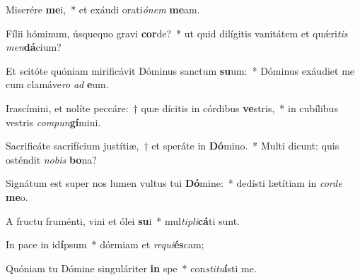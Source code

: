 \item Miserére \textbf{me}i,~* et exáudi orati\tinyhspace\textit{ónem} \textbf{me}am.
\item Fílii hóminum, úsquequo gravi \textbf{cor}de?~* ut quid dilígitis vanitátem et quǽri\tinyhspace\textit{tis} \textit{men}\textbf{dá}cium?
\item Et scitóte quóniam mirificávit Dóminus sanctum \textbf{su}um:~* Dóminus exáudiet me cum clamáve\tinyhspace\textit{ro} \textit{ad} \textbf{e}um.
\item Irascímini, et nolíte peccáre:~† quæ dícitis in córdibus \textbf{ve}stris,~* in cubílibus vestris \textit{compun}\textbf{gí}mini.
\item Sacrificáte sacrifícium justítiæ,~† et speráte in \textbf{Dó}mino.~* Multi dicunt: quis osténdit \textit{nobis} \textbf{bo}na?
\item Signátum est super nos lumen vultus tui \textbf{Dó}mine:~* dedísti lætítiam in \textit{corde} \textbf{me}o.
\item A fru\-ctu fruménti, vini et ólei \textbf{su}i~* mul\tinyhspace\textit{tipli}\textbf{cá}ti sunt.
\item In pace in id\textbf{í}psum~* dórmiam et \textit{requi}\textbf{és}cam;
\item Quóniam tu Dómine singuláriter \textbf{in} spe~* con\spurhspace\textit{stitu}\textbf{í}sti me.
